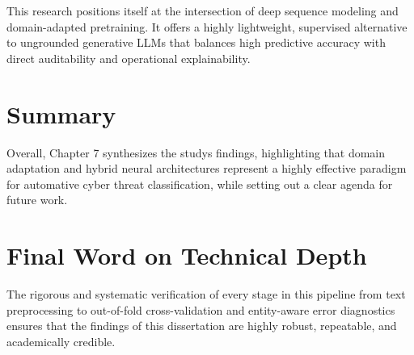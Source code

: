 \documentclass[12pt,a4paper]{report}
\begin{document}
This research positions itself at the intersection of deep sequence
modeling and domain-adapted pretraining. It offers a highly lightweight,
supervised alternative to ungrounded generative LLMs that balances high
predictive accuracy with direct auditability and operational
explainability.
\section{Summary}

Overall, Chapter 7 synthesizes the study\textquotesingle s findings,
highlighting that domain adaptation and hybrid neural architectures
represent a highly effective paradigm for automative cyber threat
classification, while setting out a clear agenda for future work.
\section{Final Word on
Technical Depth}

The rigorous and systematic verification of every stage in this pipeline
from text preprocessing to out-of-fold cross-validation and entity-aware
error diagnostics ensures that the findings of this dissertation are
highly robust, repeatable, and academically credible.
\cleardoublepage
\FloatBarrier
\label{bib}
\nocite{*}
\printbibliography[
    heading=bibintoc,
    title={Bibliography}
]



\end{document}
